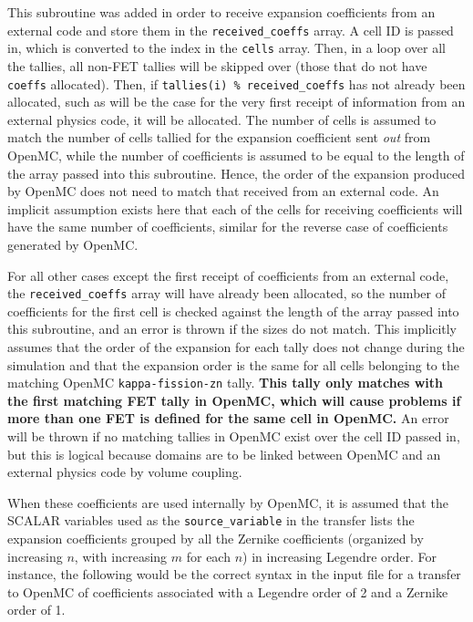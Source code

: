 \documentclass[10pt]{article}
\newcounter{subsubsubsection}[subsubsection]
\numberwithin{equation}{section} %
\begin{document}
This subroutine was added in order to receive expansion coefficients from an external code and store them in the {\tt received\_coeffs} array. A cell ID is passed in, which is converted to the index in the {\tt cells} array. Then, in a loop over all the tallies, all non-FET tallies will be skipped over (those that do not have {\tt coeffs} allocated). Then, if {\tt tallies(i) \% received\_coeffs} has not already been allocated, such as will be the case for the very first receipt of information from an external physics code, it will be allocated. The number of cells is assumed to match the number of cells tallied for the expansion coefficient sent {\it out} from OpenMC, while the number of coefficients is assumed to be equal to the length of the array passed into this subroutine. Hence, the order of the expansion produced by OpenMC does not need to match that received from an external code. An implicit assumption exists here that each of the cells for receiving coefficients will have the same number of coefficients, similar for the reverse case of coefficients generated by OpenMC. 

For all other cases except the first receipt of coefficients from an external code, the {\tt received\_coeffs} array will have already been allocated, so the number of coefficients for the first cell is checked against the length of the array passed into this subroutine, and an error is thrown if the sizes do not match. This implicitly assumes that the order of the expansion for each tally does not change during the simulation and that the expansion order is the same for all cells belonging to the matching OpenMC {\tt kappa-fission-zn} tally. {\bf This tally only matches with the first matching FET tally in OpenMC, which will cause problems if more than one FET is defined for the same cell in OpenMC.} An error will be thrown if no matching tallies in OpenMC exist over the cell ID passed in, but this is logical because domains are to be linked between OpenMC and an external physics code by volume coupling.

When these coefficients are used internally by OpenMC, it is assumed that the SCALAR variables used as the {\tt source\_variable} in the transfer lists the expansion coefficients grouped by all the Zernike coefficients (organized by increasing \(n\), with increasing \(m\) for each \(n\)) in increasing Legendre order. For instance, the following would be the correct syntax in the input file for a transfer to OpenMC of coefficients associated with a Legendre order of 2 and a Zernike order of 1.
\end{document}
